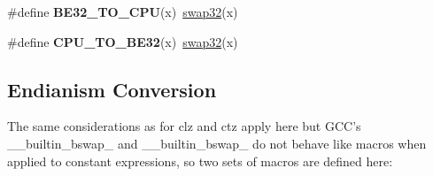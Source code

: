\begin{DoxyCompactItemize}
\item 
\hypertarget{group__group__sam0__utils_gad6fd2e5e0a54fb6300fe98868141175e}{}\#define {\bfseries B\+E32\+\_\+\+T\+O\+\_\+\+C\+P\+U}(x)~\hyperlink{group__group__sam0__utils_ga46025d8a12ccc9f4268c84e56c457416}{swap32}(x)\label{group__group__sam0__utils_gad6fd2e5e0a54fb6300fe98868141175e}

\item 
\hypertarget{group__group__sam0__utils_gabe5b68e77b7f6870895076278368d201}{}\#define {\bfseries C\+P\+U\+\_\+\+T\+O\+\_\+\+B\+E32}(x)~\hyperlink{group__group__sam0__utils_ga46025d8a12ccc9f4268c84e56c457416}{swap32}(x)\label{group__group__sam0__utils_gabe5b68e77b7f6870895076278368d201}

\end{DoxyCompactItemize}
\subsection*{Endianism Conversion}
\label{_amgrpdbefbc0e3fd569bb2d3a4f2dd9915efb}%
The same considerations as for clz and ctz apply here but G\+C\+C's \+\_\+\+\_\+builtin\+\_\+bswap\+\_ and \+\_\+\+\_\+builtin\+\_\+bswap\+\_ do not behave like macros when applied to constant expressions, so two sets of macros are defined here\+:

